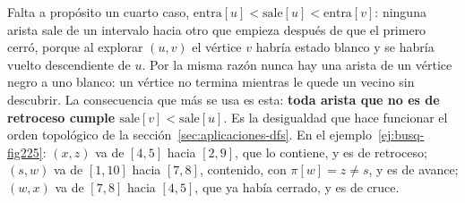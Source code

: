\documentclass[11pt,letterpaper]{article}
\begin{document}
Falta a propósito un cuarto caso,
$\text{entra}[u] < \text{sale}[u] < \text{entra}[v]$: ninguna arista
sale de un intervalo hacia otro que empieza después de que el primero
cerró, porque al explorar $(u, v)$ el vértice $v$ habría estado blanco
y se habría vuelto descendiente de $u$. Por la misma razón nunca hay
una arista de un vértice negro a uno blanco: un vértice no termina
mientras le quede un vecino sin descubrir. La consecuencia que más se
usa es esta: \textbf{toda arista que no es de retroceso cumple
$\text{sale}[v] < \text{sale}[u]$}. Es la desigualdad que hace
funcionar el orden topológico de la sección~\ref{sec:aplicaciones-dfs}.
En el ejemplo~\ref{ej:busq-fig225}: $(x, z)$ va de $[4, 5]$ hacia
$[2, 9]$, que lo contiene, y es de retroceso; $(s, w)$ va de $[1, 10]$
hacia $[7, 8]$, contenido, con $\pi[w] = z \neq s$, y es de avance;
$(w, x)$ va de $[7, 8]$ hacia $[4, 5]$, que ya había cerrado, y es de
cruce.
\end{document}
